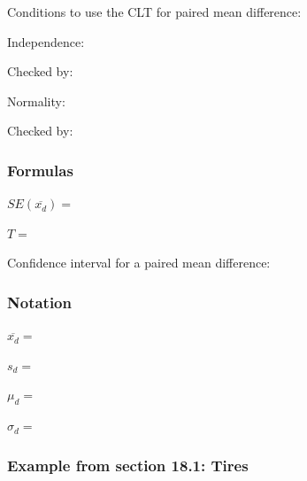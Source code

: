 \documentclass[
]{report}
\newcommand{\rgs}{\vspace{12pt}} %
\newcommand{\rgi}{\hspace{24pt}}  %
\begin{document}
Conditions to use the CLT for paired mean difference:

\rgi Independence:
\rgs

\rgi \rgi Checked by:
\rgs 

\rgi Normality:
\rgs

\rgi \rgi Checked by:
\rgs

\hypertarget{formulas-2}{%
\subsubsection*{Formulas}\label{formulas-2}}

\(SE(\overline{x_d})=\)
\rgs

\(T=\)
\rgs

Confidence interval for a paired mean difference:
\rgs

\hypertarget{notation-1}{%
\subsubsection*{Notation}\label{notation-1}}

\(\overline{x_d}=\)
\rgs

\(s_d=\)
\rgs

\(\mu_d=\)
\rgs

\(\sigma_d=\)
\rgs

\hypertarget{example-from-section-18.1-tires}{%
\subsubsection*{Example from section 18.1: Tires}\label{example-from-section-18.1-tires}}
\end{document}
